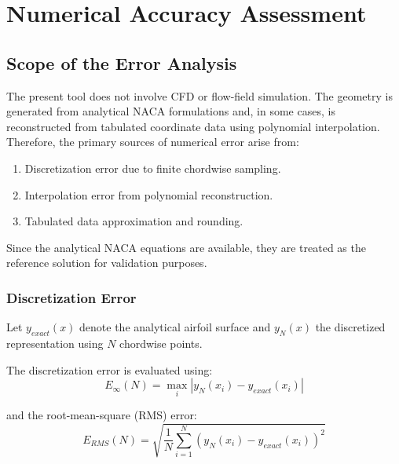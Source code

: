 
\section*{Numerical Accuracy Assessment}


\subsection*{Scope of the Error Analysis}

The present tool does not involve CFD or flow-field simulation.
The geometry is generated from analytical NACA formulations and, in some cases,
is reconstructed from tabulated coordinate data using polynomial interpolation.
Therefore, the primary sources of numerical error arise from:

\begin{enumerate}
    \item Discretization error due to finite chordwise sampling.
    \item Interpolation error from polynomial reconstruction.
    \item Tabulated data approximation and rounding.
\end{enumerate}

Since the analytical NACA equations are available, 
they are treated as the reference solution for validation purposes.


\subsubsection*{Discretization Error}

Let $y_{exact}(x)$ denote the analytical airfoil surface and
$y_N(x)$ the discretized representation using $N$ chordwise points.

The discretization error is evaluated using:
\[
E_{\infty}(N) = \max_{i} | y_N(x_i) - y_{exact}(x_i) |
\]

and the root-mean-square (RMS) error:
\[
E_{RMS}(N) =
\sqrt{
\frac{1}{N}
\sum_{i=1}^{N}
\left(
y_N(x_i) - y_{exact}(x_i)
\right)^2
}
\]

